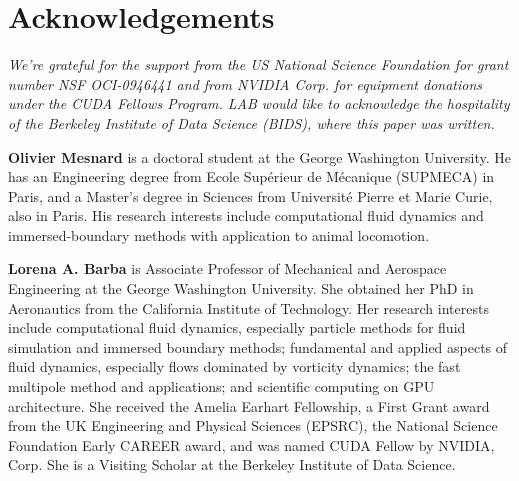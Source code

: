 \documentclass[9pt,twocolumn,twoside]{article}
\newlength{\up}
\begin{document}
\section*{Acknowledgements}
\vspace{\up}

{\sf \emph{We're grateful for the support from the US National Science Foundation for grant number NSF OCI-0946441 and from NVIDIA Corp. for equipment donations under the CUDA Fellows Program. LAB would like to acknowledge the hospitality of the Berkeley Institute of Data Science (BIDS), where this paper was written.}

\bigskip

}




\vspace{1cm}

\small
{\sf 


\noindent \textbf{Olivier Mesnard} is a doctoral student at the George Washington University. He has an Engineering degree from Ecole Sup{\'e}rieur de M{\'e}canique (SUPMECA) in Paris, and a Master's degree in Sciences from Universit{\'e} Pierre et Marie Curie, also in Paris.
His research interests include computational fluid dynamics and immersed-boundary methods with application to animal locomotion.
\bigskip

\noindent\textbf{Lorena A. Barba} is Associate Professor of Mechanical and Aerospace Engineering at the George Washington University.
She obtained her PhD in Aeronautics from the California Institute of Technology.
Her research interests include computational fluid dynamics, especially particle methods for fluid simulation and immersed boundary methods; fundamental and applied aspects of fluid dynamics, especially flows dominated by vorticity dynamics; the fast multipole method and applications; and scientific computing on GPU architecture. 
She received the Amelia Earhart Fellowship, a First Grant award from the UK Engineering and Physical Sciences (EPSRC), the National Science Foundation Early CAREER award, and was named CUDA Fellow by NVIDIA, Corp.
She is a Visiting Scholar at the Berkeley Institute of Data Science.
}
\end{document}
